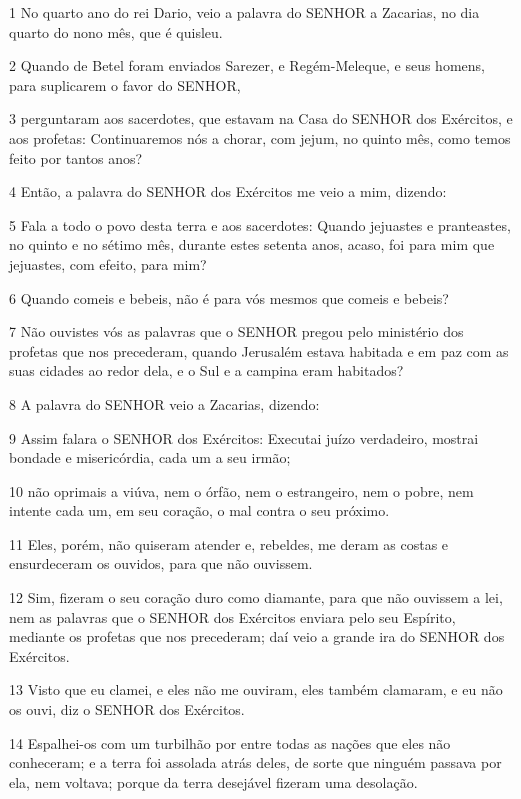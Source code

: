 \par 1 No quarto ano do rei Dario, veio a palavra do SENHOR a Zacarias, no dia quarto do nono mês, que é quisleu.
\par 2 Quando de Betel foram enviados Sarezer, e Regém-Meleque, e seus homens, para suplicarem o favor do SENHOR,
\par 3 perguntaram aos sacerdotes, que estavam na Casa do SENHOR dos Exércitos, e aos profetas: Continuaremos nós a chorar, com jejum, no quinto mês, como temos feito por tantos anos?
\par 4 Então, a palavra do SENHOR dos Exércitos me veio a mim, dizendo:
\par 5 Fala a todo o povo desta terra e aos sacerdotes: Quando jejuastes e pranteastes, no quinto e no sétimo mês, durante estes setenta anos, acaso, foi para mim que jejuastes, com efeito, para mim?
\par 6 Quando comeis e bebeis, não é para vós mesmos que comeis e bebeis?
\par 7 Não ouvistes vós as palavras que o SENHOR pregou pelo ministério dos profetas que nos precederam, quando Jerusalém estava habitada e em paz com as suas cidades ao redor dela, e o Sul e a campina eram habitados?
\par 8 A palavra do SENHOR veio a Zacarias, dizendo:
\par 9 Assim falara o SENHOR dos Exércitos: Executai juízo verdadeiro, mostrai bondade e misericórdia, cada um a seu irmão;
\par 10 não oprimais a viúva, nem o órfão, nem o estrangeiro, nem o pobre, nem intente cada um, em seu coração, o mal contra o seu próximo.
\par 11 Eles, porém, não quiseram atender e, rebeldes, me deram as costas e ensurdeceram os ouvidos, para que não ouvissem.
\par 12 Sim, fizeram o seu coração duro como diamante, para que não ouvissem a lei, nem as palavras que o SENHOR dos Exércitos enviara pelo seu Espírito, mediante os profetas que nos precederam; daí veio a grande ira do SENHOR dos Exércitos.
\par 13 Visto que eu clamei, e eles não me ouviram, eles também clamaram, e eu não os ouvi, diz o SENHOR dos Exércitos.
\par 14 Espalhei-os com um turbilhão por entre todas as nações que eles não conheceram; e a terra foi assolada atrás deles, de sorte que ninguém passava por ela, nem voltava; porque da terra desejável fizeram uma desolação.

